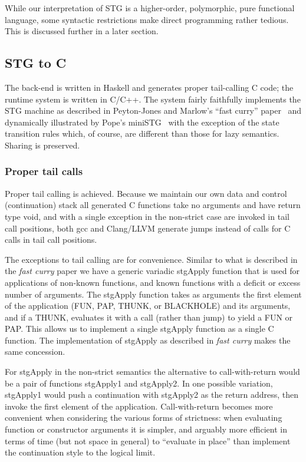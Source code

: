 \documentclass{llncs}
\begin{document}
\begin{table}
\begin{tabular}{r r c l l}
\end{tabular}
\end{table}

While our interpretation of STG is a higher-order, polymorphic, pure functional
language, some syntactic restrictions make direct programming rather tedious.
This is discussed further in a later section.

\subsection{STG to C}

The back-end is written in Haskell and generates proper tail-calling C code;
the runtime system is written in C/C++.  The system fairly faithfully
implements the STG machine as described in Peyton-Jones and Marlow's ``fast
curry'' paper~\cite{fastcurry} and dynamically illustrated by Pope's
miniSTG~\cite{ministg} with the exception of the state transition rules which,
of course, are different than those for lazy semantics.  Sharing is preserved.

\subsubsection{Proper tail calls}

Proper tail calling is achieved.  Because we maintain our own data and control
(continuation) stack all generated C functions take no arguments and have
return type void, and with a single exception in the non-strict case are
invoked in tail call positions, both gcc and Clang/LLVM generate jumps instead
of calls for C calls in tail call positions.

The exceptions to tail calling are for convenience.  Similar to what is
described in the \emph{fast curry} paper we have a generic variadic stgApply
function that is used for applications of non-known functions, and known
functions with a deficit or excess number of arguments.  The stgApply function
takes as arguments the first element of the application (FUN, PAP, THUNK, or
BLACKHOLE) and its arguments, and if a THUNK, evaluates it with a call (rather
than jump) to yield a FUN or PAP.  This allows us to implement a single
stgApply function as a single C function.  The implementation of stgApply as
described in \emph{fast curry} makes the same concession.

For stgApply in the non-strict semantics the alternative to call-with-return
would be a pair of functions stgApply1 and stgApply2.  In one possible variation, 
stgApply1 would push a continuation with stgApply2 as the return address, then
invoke the first element of the application.  Call-with-return becomes more
convenient when considering the various forms of strictness:  when evaluating
function or constructor arguments it is simpler, and arguably more efficient
in terms of time (but not space in general) to ``evaluate in place'' than
implement the continuation style to the logical limit.
\end{document}
